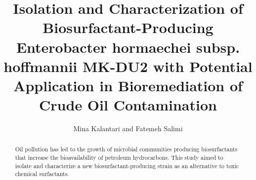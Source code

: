 \documentclass{svjour3}
\begin{document}
\title{Isolation and Characterization of Biosurfactant-Producing Enterobacter hormaechei subsp. hoffmannii MK-DU2 with Potential Application in Bioremediation of Crude Oil Contamination}
\author{Mina Kalantari and Fatemeh Salimi}
\maketitle
\begin{abstract}
Oil pollution has led to the growth of microbial communities producing biosurfactants that increase the bioavailability of petroleum hydrocarbons. This study aimed to isolate and characterize a new biosurfactant-producing strain as an alternative to toxic chemical surfactants.
\end{abstract}
\end{document}
